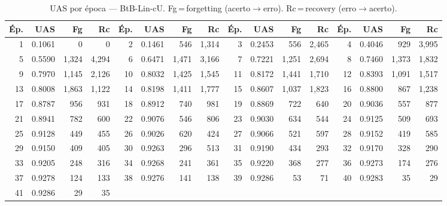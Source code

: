 \begin{table}[ht]
\centering\scriptsize
\caption{UAS por época --- BtB-Lin-cU. Fg\,=\,forgetting (acerto$\to$erro). Rc\,=\,recovery (erro$\to$acerto).}
\label{tab:uas-predictions-results-bertimbau-base-linear}
\begin{tabular}{rrrr rrrr rrrr rrrr}
\toprule
\textbf{Ép.} & \textbf{UAS} & \textbf{Fg} & \textbf{Rc} & \textbf{Ép.} & \textbf{UAS} & \textbf{Fg} & \textbf{Rc} & \textbf{Ép.} & \textbf{UAS} & \textbf{Fg} & \textbf{Rc} & \textbf{Ép.} & \textbf{UAS} & \textbf{Fg} & \textbf{Rc} \\
\midrule
1 & 0.1061 & 0 & 0 & 2 & 0.1461 & 546 & 1,314 & 3 & 0.2453 & 556 & 2,465 & 4 & 0.4046 & 929 & 3,995 \\
5 & 0.5590 & 1,324 & 4,294 & 6 & 0.6471 & 1,471 & 3,166 & 7 & 0.7221 & 1,251 & 2,694 & 8 & 0.7460 & 1,373 & 1,832 \\
9 & 0.7970 & 1,145 & 2,126 & 10 & 0.8032 & 1,425 & 1,545 & 11 & 0.8172 & 1,441 & 1,710 & 12 & 0.8393 & 1,091 & 1,517 \\
13 & 0.8008 & 1,863 & 1,122 & 14 & 0.8198 & 1,411 & 1,777 & 15 & 0.8607 & 1,037 & 1,823 & 16 & 0.8800 & 867 & 1,238 \\
17 & 0.8787 & 956 & 931 & 18 & 0.8912 & 740 & 981 & 19 & 0.8869 & 722 & 640 & 20 & 0.9036 & 557 & 877 \\
21 & 0.8941 & 782 & 600 & 22 & 0.9076 & 546 & 806 & 23 & 0.9030 & 634 & 544 & 24 & 0.9125 & 509 & 693 \\
25 & 0.9128 & 449 & 455 & 26 & 0.9026 & 620 & 424 & 27 & 0.9066 & 521 & 597 & 28 & 0.9152 & 419 & 585 \\
29 & 0.9150 & 409 & 405 & 30 & 0.9263 & 296 & 513 & 31 & 0.9190 & 434 & 293 & 32 & 0.9170 & 328 & 290 \\
33 & 0.9205 & 248 & 316 & 34 & 0.9268 & 241 & 361 & 35 & 0.9220 & 368 & 277 & 36 & 0.9273 & 174 & 276 \\
37 & 0.9278 & 124 & 133 & 38 & 0.9276 & 141 & 138 & 39 & 0.9286 & 53 & 71 & 40 & 0.9283 & 35 & 29 \\
41 & 0.9286 & 29 & 35 &  & & &  &  & & &  &  & & &  \\
\bottomrule
\end{tabular}
\end{table}
